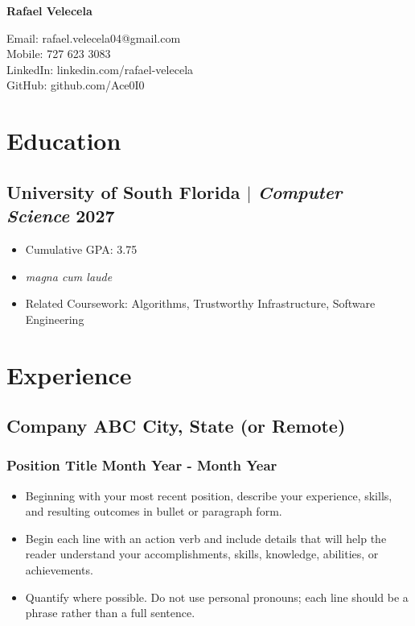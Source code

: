\documentclass[11pt]{article} %
\begin{document}
\begin{center}
	\begin{minipage}{0.5\textwidth}
		{\Huge\bfseries
			Rafael Velecela %
		} \\ \medskip
		
	\end{minipage} \hfill
	\begin{minipage}{0.4\textwidth}
		\raggedleft
		Email: rafael.velecela04@gmail.com \\
		Mobile: 727 623 3083 \\
		LinkedIn: linkedin.com/rafael-velecela \\
		GitHub: github.com/Ace0I0
	\end{minipage}
\end{center}

\section{Education}
\subsection{University of South Florida $|$ {\normalfont\itshape Computer Science} \hfill 2027}
\begin{itemize}
	\item Cumulative GPA: 3.75
	\item \textit{magna cum laude} 
  \item Related Coursework: Algorithms, Trustworthy Infrastructure, Software Engineering
\end{itemize}

\section{Experience}
\subsection{Company ABC \hfill City, State (or Remote)}
\subsubsection{Position Title \hfill  Month Year - Month Year}
\begin{itemize}
	\item Beginning with your most recent position, describe your experience, skills, and resulting outcomes in bullet or paragraph form.
	\item Begin each line with an action verb and include details that will help the reader understand your accomplishments, skills, knowledge, abilities, or achievements.
	\item Quantify where possible. Do not use personal pronouns; each line should be a phrase rather than a full sentence.
\end{itemize}
\end{document}
